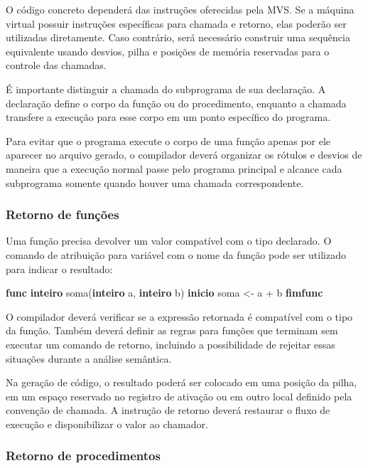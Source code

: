 \documentclass[
  brazilian,
  letterpaper,
]{book}
\newenvironment{Shaded}{\begin{snugshade}}{\end{snugshade}}
\newcommand{\KeywordTok}[1]{\textcolor[rgb]{0.00,0.23,0.31}{\textbf{#1}}}
\newcommand{\NormalTok}[1]{\textcolor[rgb]{0.00,0.23,0.31}{#1}}
\theoremstyle{plain}
\theoremstyle{definition}
\theoremstyle{remark}
\begin{document}
O código concreto dependerá das instruções oferecidas pela MVS. Se a
máquina virtual possuir instruções específicas para chamada e retorno,
elas poderão ser utilizadas diretamente. Caso contrário, será necessário
construir uma sequência equivalente usando desvios, pilha e posições de
memória reservadas para o controle das chamadas.

É importante distinguir a chamada do subprograma de sua declaração. A
declaração define o corpo da função ou do procedimento, enquanto a
chamada transfere a execução para esse corpo em um ponto específico do
programa.

Para evitar que o programa execute o corpo de uma função apenas por ele
aparecer no arquivo gerado, o compilador deverá organizar os rótulos e
desvios de maneira que a execução normal passe pelo programa principal e
alcance cada subprograma somente quando houver uma chamada
correspondente.

\subsubsection{Retorno de funções}\label{retorno-de-funuxe7uxf5es}

Uma função precisa devolver um valor compatível com o tipo declarado. O
comando de atribuição para variável com o nome da função pode ser
utilizado para indicar o resultado:

\begin{Shaded}
\begin{Highlighting}[]
\KeywordTok{func} \KeywordTok{inteiro}\NormalTok{ soma(}\KeywordTok{inteiro}\NormalTok{ a, }\KeywordTok{inteiro}\NormalTok{ b)}
\KeywordTok{inicio}
\NormalTok{    soma \textless{}{-} a + b}
\KeywordTok{fimfunc}
\end{Highlighting}
\end{Shaded}

O compilador deverá verificar se a expressão retornada é compatível com
o tipo da função. Também deverá definir as regras para funções que
terminam sem executar um comando de retorno, incluindo a possibilidade
de rejeitar essas situações durante a análise semântica.

Na geração de código, o resultado poderá ser colocado em uma posição da
pilha, em um espaço reservado no registro de ativação ou em outro local
definido pela convenção de chamada. A instrução de retorno deverá
restaurar o fluxo de execução e disponibilizar o valor ao chamador.

\subsubsection{Retorno de procedimentos}\label{retorno-de-procedimentos}
\end{document}
